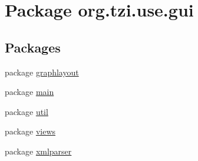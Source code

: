 \hypertarget{namespaceorg_1_1tzi_1_1use_1_1gui}{\section{Package org.\-tzi.\-use.\-gui}
\label{namespaceorg_1_1tzi_1_1use_1_1gui}
}
\subsection*{Packages}
\begin{DoxyCompactItemize}
\item 
package \hyperlink{namespaceorg_1_1tzi_1_1use_1_1gui_1_1graphlayout}{graphlayout}
\item 
package \hyperlink{namespaceorg_1_1tzi_1_1use_1_1gui_1_1main}{main}
\item 
package \hyperlink{namespaceorg_1_1tzi_1_1use_1_1gui_1_1util}{util}
\item 
package \hyperlink{namespaceorg_1_1tzi_1_1use_1_1gui_1_1views}{views}
\item 
package \hyperlink{namespaceorg_1_1tzi_1_1use_1_1gui_1_1xmlparser}{xmlparser}
\end{DoxyCompactItemize}
